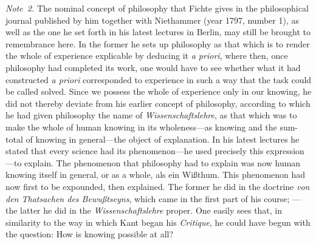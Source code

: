 \documentclass[12pt,a4paper]{book}
\begin{document}
{\small\emph{Note~2.} The nominal concept of philosophy that Fichte gives in the
philosophical journal published by him together with Niethammer (year 1797, number
1), as well as the one he set forth in his latest lectures in Berlin, may still be
brought to remembrance here. In the former he sets up philosophy as that which is to
render the whole of experience explicable by deducing it \textit{a priori}, where
then, once philosophy had completed its work, one would have to see whether what it
had constructed \textit{a priori} corresponded to experience in such a way that the
task could be called solved. Since we possess the whole of experience only in our
knowing, he did not thereby deviate from his earlier concept of philosophy,
according to which he had given philosophy the name of \textit{Wissenschaftslehre},
as that which was to make the whole of human knowing in its wholeness---as knowing
and the sum-total of knowing in general---the object of explanation. In his latest
lectures he stated that every science had its phenomenon---he used precisely this
expression---to explain. The phenomenon that philosophy had to explain was now
human knowing itself in general, or as a whole, als ein Wißthum. This phenomenon
had now first to be expounded, then explained. The former he did in the doctrine
\textit{von den Thatsachen des Bewußtseyns}, which came in the first part of his
course; ---the latter he did in the \textit{Wissenschaftslehre} proper. One easily
sees that, in similarity to the way in which Kant began his \textit{Critique}, he
could have begun with the question: How is knowing possible at all?\par}
\end{document}
